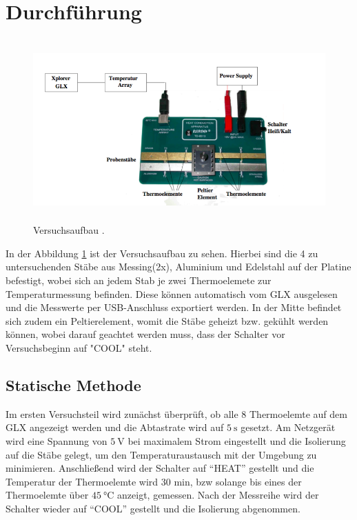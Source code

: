 
\section{Durchführung}
\begin{figure}[H]
  \centering
  \includegraphics[height=7cm]{Aufbau.png}
  \caption{Versuchsaufbau \cite{skript}.}
  \label{fig:aufbau}
\end{figure}
In der Abbildung \ref{fig:aufbau} ist der Versuchsaufbau zu sehen. Hierbei sind die
4 zu untersuchenden Stäbe aus Messing(2x), Aluminium und Edelstahl auf der Platine befestigt,
wobei sich an jedem Stab je zwei Thermoelemete zur Temperaturmessung befinden. Diese
können automatisch vom GLX ausgelesen und die Messwerte per USB-Anschluss exportiert
werden.
In der Mitte befindet sich zudem ein Peltierelement, womit die Stäbe geheizt bzw. gekühlt
werden können, wobei darauf geachtet werden muss, dass der Schalter vor Versuchsbeginn auf
"COOL" steht.

\subsection{Statische Methode}
Im ersten Versuchsteil wird zunächst überprüft, ob alle 8 Thermoelemte auf dem GLX
angezeigt werden und die Abtastrate wird auf $\SI{5}{\second}$ gesetzt. Am Netzgerät wird eine Spannung
von $\SI{5}{\volt}$ bei maximalem Strom eingestellt und die Isolierung auf die Stäbe gelegt, um
den Temperaturaustausch mit der Umgebung zu minimieren. Anschließend wird der Schalter
auf “HEAT” gestellt und die Temperatur der Thermoelemte wird 30 min, bzw solange bis
eines der Thermoelemte über $\SI{45}{\celsius}$ anzeigt, gemessen. Nach der Messreihe
wird der Schalter wieder auf “COOL” gestellt und die Isolierung abgenommen.

